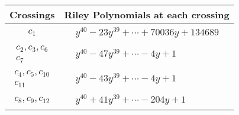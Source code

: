 \documentclass[1p]{elsarticle_modified}
\theoremstyle{definition}
\begin{document}
\begin{tabular}{m{50pt}|m{274pt}}
Crossings & \hspace{64pt}Riley Polynomials at each crossing \\
\hline $$\begin{aligned}c_{1}\end{aligned}$$&$\begin{aligned}
&y^{40}-23 y^{39}+\cdots+70036 y+134689
\end{aligned}$\\
\hline $$\begin{aligned}c_{2},c_{3},c_{6}\\c_{7}\end{aligned}$$&$\begin{aligned}
&y^{40}-47 y^{39}+\cdots-4 y+1
\end{aligned}$\\
\hline $$\begin{aligned}c_{4},c_{5},c_{10}\\c_{11}\end{aligned}$$&$\begin{aligned}
&y^{40}-43 y^{39}+\cdots-4 y+1
\end{aligned}$\\
\hline $$\begin{aligned}c_{8},c_{9},c_{12}\end{aligned}$$&$\begin{aligned}
&y^{40}+41 y^{39}+\cdots-204 y+1
\end{aligned}$\\
\hline
\end{tabular}
\vskip 2pc
\end{document}
